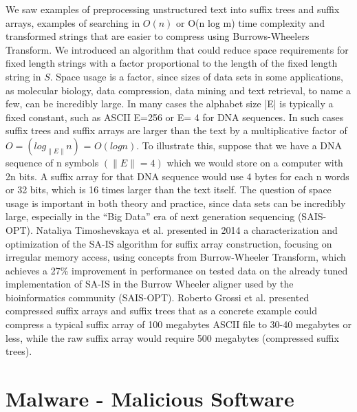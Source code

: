 \documentclass[12pt]{article} %
\begin{document}
We saw examples of preprocessing unstructured text into suffix trees and suffix arrays, examples of searching in $O(n)$ or O(n log m) time complexity and transformed strings that are easier to compress using Burrows-Wheelers Transform. We introduced an algorithm that could reduce space requirements for fixed length strings with a factor proportional to the length of the fixed length string in $S$. Space usage is a factor, since sizes of data sets in some applications, as molecular biology, data compression, data mining and text retrieval, to name a few, can be incredibly large. In many cases the alphabet size |E| is typically a fixed constant, such as ASCII E=256 or E= 4 for DNA sequences. In such cases suffix trees and suffix arrays are larger than the text by a multiplicative factor of $O=(log_{\|E\|}n)$ = $O(log n)$. To illustrate this, suppose that we have a DNA sequence of n symbols $(\|E\|=4)$ which we would store on a computer with 2n bits. A suffix array for that DNA sequence would use 4 bytes for each n words or 32 bits, which is 16 times larger than the text itself. 
The question of space usage is important in both theory and practice, since data sets can be incredibly large, especially in the “Big Data” era of next generation sequencing (SAIS-OPT). Nataliya Timoshevskaya et al. presented in 2014 a characterization and optimization of the SA-IS algorithm for suffix array construction, focusing on irregular memory access, using concepts from Burrow-Wheeler Transform, which achieves a 27\% improvement in performance on tested data on the already tuned implementation of SA-IS in the Burrow Wheeler aligner used by the bioinformatics community (SAIS-OPT). Roberto Grossi et al. presented compressed suffix arrays and suffix trees that as a concrete example could compress a typical suffix array of 100 megabytes ASCII file to 30-40 megabytes or less, while the raw suffix array would require 500 megabytes (compressed suffix trees). 

\section{Malware - Malicious Software}
\end{document}
